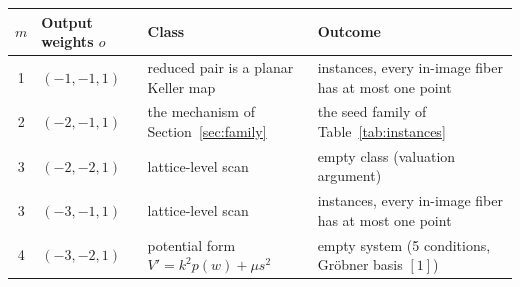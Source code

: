 \begin{tabular}{c>{\raggedright\arraybackslash}p{}>{\raggedright\arraybackslash}p{}>{\raggedright\arraybackslash}p{}}
\toprule
$m$ & Output weights $o$ & Class & Outcome \\
\midrule
1 & $(-1,-1,1)$ & reduced pair is a planar Keller map & 93 instances, every in-image fiber has at most one point \\
2 & $(-2,-1,1)$ & the mechanism of Section~\ref{sec:family} & the seed family of Table~\ref{tab:instances} \\
3 & $(-2,-2,1)$ & lattice-level scan & empty class (valuation argument) \\
3 & $(-3,-1,1)$ & lattice-level scan & 60 instances, every in-image fiber has at most one point \\
4 & $(-3,-2,1)$ & potential form $V'=k^2p(w)+\mu s^2$ & empty system (5 conditions, Gr\"obner basis $[1]$) \\
\bottomrule
\end{tabular}
